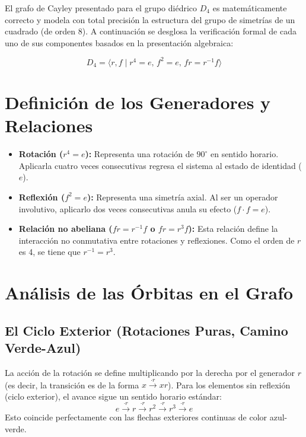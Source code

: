 \documentclass{article}
\begin{document}
El grafo de Cayley presentado para el grupo diédrico $D_4$ es matemáticamente correcto y modela con total precisión la estructura del grupo de simetrías de un cuadrado (de orden 8). A continuación se desglosa la verificación formal de cada uno de sus componentes basados en la presentación algebraica:

\[
D_4 = \langle r, f \mid r^4 = e, \, f^2 = e, \, fr = r^{-1}f \rangle
\]

\section{Definición de los Generadores y Relaciones}
\begin{itemize}
    \item \textbf{Rotación ($r^4 = e$):} Representa una rotación de $90^\circ$ en sentido horario. Aplicarla cuatro veces consecutivas regresa el sistema al estado de identidad ($e$).
    \item \textbf{Reflexión ($f^2 = e$):} Representa una simetría axial. Al ser un operador involutivo, aplicarlo dos veces consecutivas anula su efecto ($f \cdot f = e$).
    \item \textbf{Relación no abeliana ($fr = r^{-1}f$ o $fr = r^3f$):} Esta relación define la interacción no conmutativa entre rotaciones y reflexiones. Como el orden de $r$ es 4, se tiene que $r^{-1} = r^3$.
\end{itemize}

\section{Análisis de las Órbitas en el Grafo}

\subsection{El Ciclo Exterior (Rotaciones Puras, Camino Verde-Azul)}
La acción de la rotación se define multiplicando por la derecha por el generador $r$ (es decir, la transición es de la forma $x \xrightarrow{\cdot r} xr$). 
Para los elementos sin reflexión (ciclo exterior), el avance sigue un sentido horario estándar:
\[
e \xrightarrow{\cdot r} r \xrightarrow{\cdot r} r^2 \xrightarrow{\cdot r} r^3 \xrightarrow{\cdot r} e
\]
Esto coincide perfectamente con las flechas exteriores continuas de color azul-verde.
\end{document}
